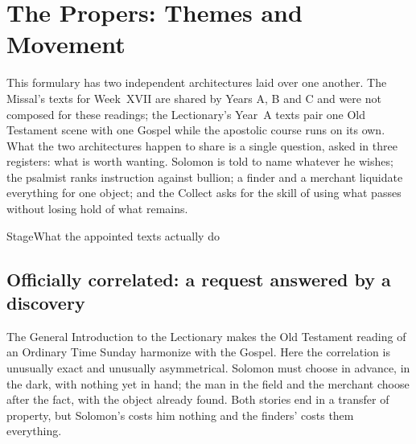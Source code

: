 \section*{The Propers: Themes and Movement}

This formulary has two independent architectures laid over one another. The Missal's texts for Week~XVII are shared by Years A, B and C and were not composed for these readings; the Lectionary's Year~A texts pair one Old Testament scene with one Gospel while the apostolic course runs on its own. What the two architectures happen to share is a single question, asked in three registers: what is worth wanting. Solomon is told to name whatever he wishes; the psalmist ranks instruction against bullion; a finder and a merchant liquidate everything for one object; and the Collect asks for the skill of using what passes without losing hold of what remains.

\begin{twocoltable}{Stage}{What the appointed texts actually do}
\end{twocoltable}

\subsection*{Officially correlated: a request answered by a discovery}

The General Introduction to the Lectionary makes the Old Testament reading of an Ordinary Time Sunday harmonize with the Gospel. Here the correlation is unusually exact and unusually asymmetrical. Solomon must choose in advance, in the dark, with nothing yet in hand; the man in the field and the merchant choose after the fact, with the object already found. Both stories end in a transfer of property, but Solomon's costs him nothing and the finders' costs them everything.

